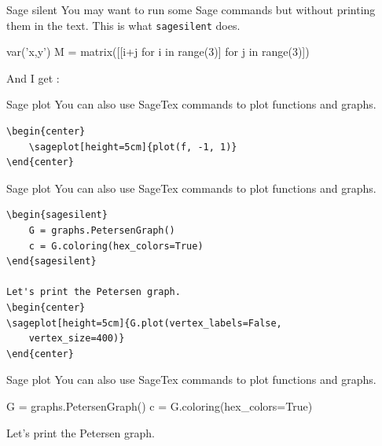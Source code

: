 \documentclass{beamer}
\begin{document}
	\begin{frame}[fragile]{Sage silent}
		You may want to run some Sage commands but without printing them in the text. This is what \texttt{sagesilent} does. \newline
		
		\begin{sagesilent}
			var('x,y')
			M = matrix([[i+j for i in range(3)] for j in range(3)])
		\end{sagesilent}
	
		And I get : \newline
		

	\end{frame}
	\begin{frame}[fragile]{Sage plot}
	You can also use SageTex commands to plot functions and graphs. 
		\begin{Verbatim}[frame=single]
\begin{center}
	\sageplot[height=5cm]{plot(f, -1, 1)}
\end{center}
		\end{Verbatim}
		
		\begin{center}\end{center}
		
	\end{frame}
	\begin{frame}[fragile]{Sage plot}
	You can also use SageTex commands to plot functions and graphs. \newline 
	 
	\begin{Verbatim}[frame=single]
\begin{sagesilent}
	G = graphs.PetersenGraph()
	c = G.coloring(hex_colors=True)
\end{sagesilent}

Let's print the Petersen graph.
\begin{center}
\sageplot[height=5cm]{G.plot(vertex_labels=False, 
	vertex_size=400)}
\end{center}
	\end{Verbatim}	
	\end{frame}
	\begin{frame}[fragile]{Sage plot}
		You can also use SageTex commands to plot functions and graphs. \newline
		
		\begin{sagesilent}
			G = graphs.PetersenGraph()
			c = G.coloring(hex_colors=True)
		\end{sagesilent}

		Let's print the Petersen graph.
		\begin{center}
		\end{center}
	
	\end{frame}
\end{document}
